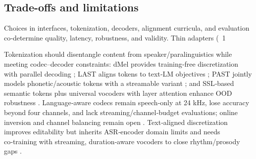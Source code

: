 \documentclass{article}
\begin{document}
\subsection{Trade-offs and limitations} \label{subsec:Trade-offs and limitations}

Choices in interfaces, tokenization, decoders, alignment curricula, and evaluation co‑determine quality, latency, robustness, and validity. Thin adapters (~1%

Tokenization should disentangle content from speaker/paralinguistics while meeting codec–decoder constraints: dMel provides training‑free discretization with parallel decoding \cite{bai2025dmelspeechtokenizationmadesimple}; LAST aligns tokens to text‑LM objectives \cite{turetzky2024lastlanguagemodelawarespeechtokenization}; PAST jointly models phonetic/acoustic tokens with a streamable variant \cite{har-tuv2025pastphoneticacousticspeechtokenizer}; and SSL‑based semantic tokens plus universal vocoders with layer attention enhance OOD robustness \cite{mousavi2024howshouldweextractdiscreteaudiotokenssel}. Language‑aware codecs remain speech‑only at 24 kHz, lose accuracy beyond four channels, and lack streaming/channel‑budget evaluations; online inversion and channel balancing remain open \cite{ji2025languagecodecbridgingdiscreterepresentat}. Text‑aligned discretization improves editability but inherits ASR‑encoder domain limits and needs co‑training with streaming, duration‑aware vocoders to close rhythm/prosody gaps \cite{tsunoo2024decoderonlyarchitecturespeechrecognition}.
\end{document}
